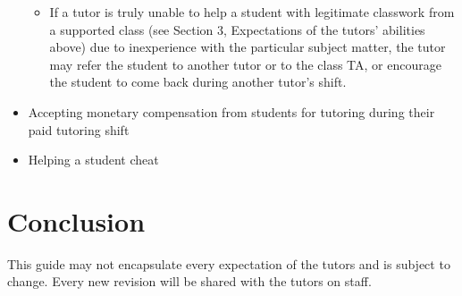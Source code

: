 \documentclass[12pt]{article}
\begin{document}
\begin{itemize}
	\begin{itemize}
	\item If a tutor is truly unable to help a student with legitimate 
classwork from a supported class (see Section 3, Expectations of the tutors' abilities above)
due to inexperience with the particular subject matter, the tutor
may refer the student to another tutor or to the class TA, or encourage the
student to come back during another tutor's shift. 
	\end{itemize}
\item Accepting monetary compensation from students for tutoring during 
their paid tutoring shift
\item Helping a student cheat
\end{itemize}

\section{Conclusion}
This guide may not encapsulate every expectation of the tutors and 
is subject to change. Every new revision will be shared with the 
tutors on staff. 
\end{document}
